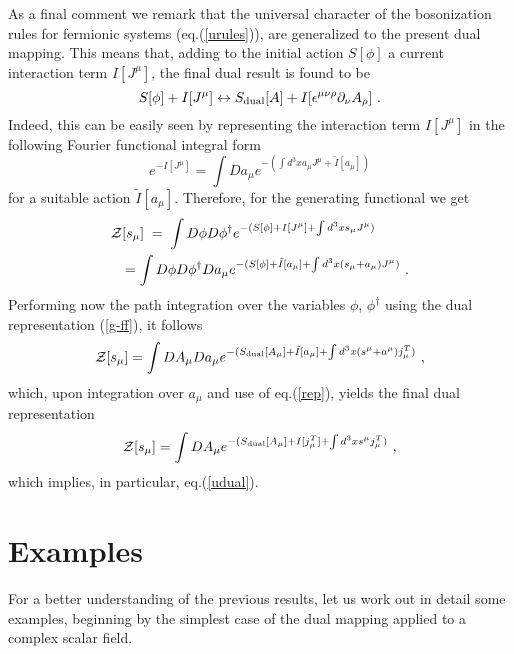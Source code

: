 \documentclass[a4paper,12pt]{article}
\begin{document}
As a final comment we remark that the universal character of the
bosonization rules for fermionic systems (eq.(\ref{urules})), are
generalized to the present dual mapping. This means that, adding to
the initial action $S[\phi]$ a current interaction term $I[J^\mu]$, the
final dual result is found to be
\begin{equation}
S[\phi]+I[J^\mu] \leftrightarrow S_{{\rm dual}}[A]+I[\epsilon^{\mu \nu \rho}\partial_\nu A_\rho] \ .
\label{udual}
\end{equation}
Indeed, this can be easily seen by representing the interaction term
$I[J^\mu]$ in the following Fourier functional integral form
\begin{equation}
e^{-I[J^\mu]}=\int Da_\mu e^{-(\int d^3x a_\mu J^\mu + \tilde{I}[a_\mu])}
\label{rep}
\end{equation}
for a suitable action $\tilde{I}[a_\mu]$. Therefore, for the generating
functional we get
\begin{eqnarray}
\lefteqn{{\mathcal Z}[s_\mu]\;=\; \int D\phi D\phi ^{\dagger } e^{-(S[\phi] +I[J^\mu]+
\int d^3x s_\mu J^\mu)}\nonumber }\\
&&=\int D\phi D\phi ^{\dagger }Da_\mu e^{-(S[\phi] +\tilde{I}[a_\mu]+
\int d^3x (s_\mu+a_\mu) J^\mu)} \ .
\end{eqnarray}
Performing now the path integration over the variables $\phi$, $\phi^\dagger$
using the dual representation (\ref{g-ff}), it follows
\begin{equation}
{\mathcal Z}[s_\mu]=\int DA_\mu Da_\mu e^{-(S_{{\rm dual}}[A_\mu] +\tilde{I}[a_\mu]+
\int d^3x (s^\mu+a^\mu)j^T_\mu) } \ ,
\end{equation}
which, upon integration over $a_\mu$ and use of eq.(\ref{rep}), yields
the final dual representation
\begin{equation}
{\mathcal Z}[s_\mu]=\int DA_\mu  e^{-(S_{{\rm dual}}[A_\mu] + I[j^T_\mu]+
\int d^3x s^\mu j^T_\mu) } \ ,
\end{equation}
which implies, in particular, eq.(\ref{udual}).

\section{Examples}\label{examples}
For a better understanding of the previous results, let us work out in
detail some examples, beginning by the simplest case of the dual
mapping applied to a complex scalar field.
\end{document}
